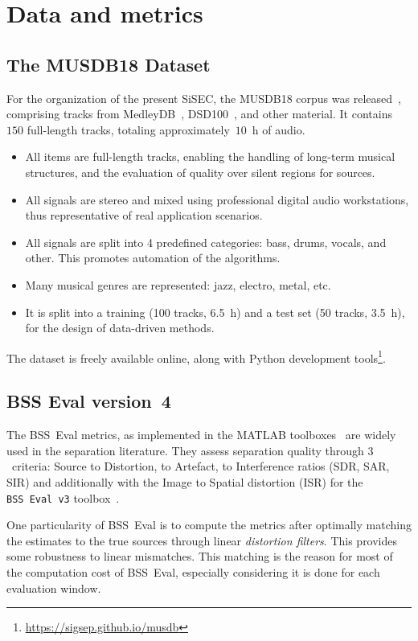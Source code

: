 \documentclass{llncs}
\begin{document}
\section{Data and metrics}

\subsection{The MUSDB18 Dataset}
For the organization of the present SiSEC, the MUSDB18 corpus was released~\cite{musdb18}, comprising tracks from MedleyDB~\cite{medleydb}, DSD100~\cite{sisec2015,sisec2016}, and other material. It contains $150$ full-length tracks, totaling approximately~$10$~h of audio.
\begin{itemize}
\item All items are full-length tracks, enabling the handling of long-term musical structures, and the evaluation of quality over silent regions for sources.
\item All signals are stereo and mixed using professional digital audio workstations, thus representative of real application scenarios.
\item All signals are split into 4 predefined categories: bass, drums, vocals, and other. This promotes automation of the algorithms.
\item Many musical genres are represented: jazz, electro, metal, etc.
\item It is split into a training (100 tracks, 6.5~h) and a test set (50 tracks, 3.5~h), for the design of data-driven methods.
\end{itemize}
The dataset is freely available online, along with Python development tools\footnote{\url{https://sigsep.github.io/musdb}}.

\subsection{BSS Eval version~4}
\label{ssec:bsseval-results}

The BSS~Eval metrics, as implemented in the MATLAB toolboxes~\cite{bssevalv2,bssevalv3} are widely used in the separation literature. They assess separation quality  through $3$~criteria: Source to Distortion, to Artefact, to Interference ratios (SDR, SAR, SIR) and additionally with the Image to Spatial distortion (ISR) for the \texttt{BSS~Eval v3} toolbox~\cite{bssevalv3}.

One particularity of BSS~Eval is to compute the metrics after optimally matching the estimates to the true sources through linear \textit{distortion filters}. This provides some robustness to linear mismatches. This matching is the reason for most of the computation cost of BSS~Eval, especially considering it is done for each evaluation window.
\end{document}

